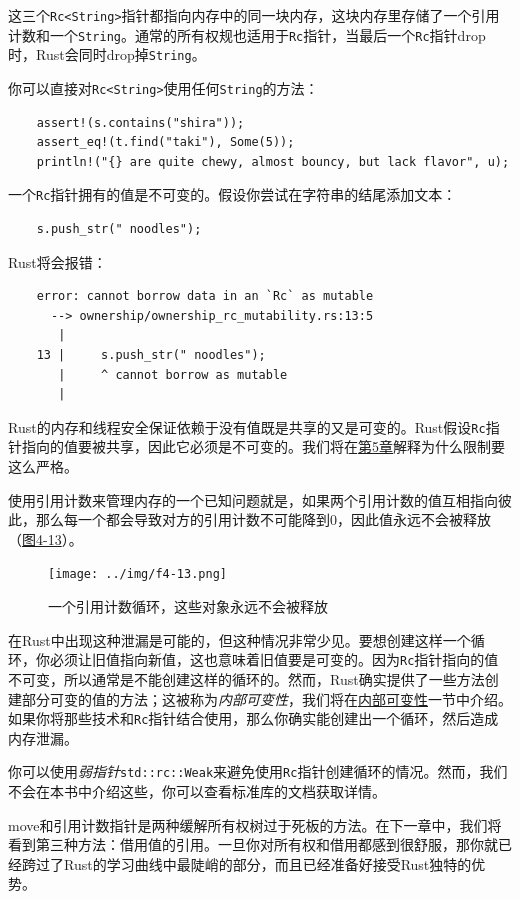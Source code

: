 这三个\texttt{Rc<String>}指针都指向内存中的同一块内存，这块内存里存储了一个引用计数和一个\texttt{String}。通常的所有权规也适用于\texttt{Rc}指针，当最后一个\texttt{Rc}指针drop时，Rust会同时drop掉\texttt{String}。

你可以直接对\texttt{Rc<String>}使用任何\texttt{String}的方法：
\begin{verbatim}
    assert!(s.contains("shira"));
    assert_eq!(t.find("taki"), Some(5));
    println!("{} are quite chewy, almost bouncy, but lack flavor", u);
\end{verbatim}

一个\texttt{Rc}指针拥有的值是不可变的。假设你尝试在字符串的结尾添加文本：
\begin{verbatim}
    s.push_str(" noodles");
\end{verbatim}

Rust将会报错：
\begin{verbatim}
    error: cannot borrow data in an `Rc` as mutable
      --> ownership/ownership_rc_mutability.rs:13:5
       |
    13 |     s.push_str(" noodles");
       |     ^ cannot borrow as mutable
       |
\end{verbatim}

Rust的内存和线程安全保证依赖于没有值既是共享的又是可变的。Rust假设\texttt{Rc}指针指向的值要被共享，因此它必须是不可变的。我们将在\hyperref[ch05]{第5章}解释为什么限制要这么严格。

 使用引用计数来管理内存的一个已知问题就是，如果两个引用计数的值互相指向彼此，那么每一个都会导致对方的引用计数不可能降到0，因此值永远不会被释放（\hyperref[f4-13]{图4-13}）。

 \begin{figure}[htbp]
    \centering
    \texttt{[image: ../img/f4-13.png]}
    \caption{一个引用计数循环，这些对象永远不会被释放}
    \label{f4-13}
 \end{figure}

在Rust中出现这种泄漏是可能的，但这种情况非常少见。要想创建这样一个循环，你必须让旧值指向新值，这也意味着旧值要是可变的。因为\texttt{Rc}指针指向的值不可变，所以通常是不能创建这样的循环的。然而，Rust确实提供了一些方法创建部分可变的值的方法；这被称为\emph{内部可变性}，我们将在\hyperref[intermut]{内部可变性}一节中介绍。如果你将那些技术和\texttt{Rc}指针结合使用，那么你确实能创建出一个循环，然后造成内存泄漏。

你可以使用\emph{弱指针}\texttt{std::rc::Weak}来避免使用\texttt{Rc}指针创建循环的情况。然而，我们不会在本书中介绍这些，你可以查看标准库的文档获取详情。

move和引用计数指针是两种缓解所有权树过于死板的方法。在下一章中，我们将看到第三种方法：借用值的引用。一旦你对所有权和借用都感到很舒服，那你就已经跨过了Rust的学习曲线中最陡峭的部分，而且已经准备好接受Rust独特的优势。
